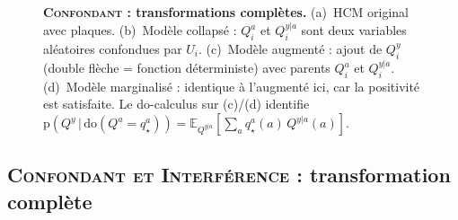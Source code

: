 \documentclass[11pt,a4paper]{article}
\newcommand{\rmdo}{\mathrm{do}}
\newcommand{\g}{\,\vert\,}
\newcommand{\pr}{\mathrm{p}}
\begin{document}
{\begin{figure}[H]
\begin{subfigure}[t]{0.22\textwidth}
\end{subfigure}
\caption{\textbf{\textsc{Confondant} : transformations complètes.}
(a)~HCM original avec plaques.
(b)~Modèle collapsé : $Q^a_i$ et $Q^{y|a}_i$ sont deux variables aléatoires confondues par $U_i$.
(c)~Modèle augmenté : ajout de $Q^y_i$ (double flèche = fonction déterministe) avec parents $Q^a_i$ et $Q^{y|a}_i$.
(d)~Modèle marginalisé : identique à l'augmenté ici, car la positivité est satisfaite.
Le do-calculus sur (c)/(d) identifie $\pr(Q^y \g \rmdo(Q^a = q^a_\star)) = \mathbb{E}_{Q^{y|a}}[\sum_a q^a_\star(a)\,Q^{y|a}(a)]$.}
\label{fig:app_confounder}
\end{figure}

\vspace{0.8em}
\subsection{\textsc{Confondant et Interférence} : transformation complète}
\vspace{-0.5em}

}
\end{document}
